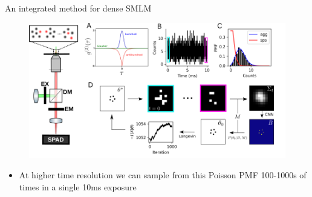 \documentclass{beamer}					%
\begin{document}
\begin{frame}{An integrated method for dense SMLM}
\begin{figure}
\includegraphics[width=\textwidth]{SPAD.png}
\end{figure}
\begin{itemize}
\item At higher time resolution we can sample from this Poisson PMF 100-1000s of times in a single 10ms exposure
\end{itemize}
\end{frame}

\end{document}
